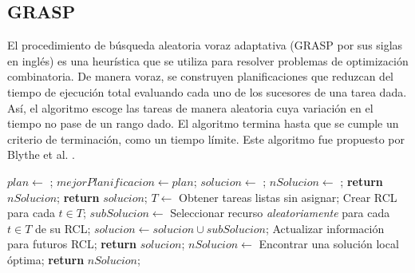 
\subsection{GRASP}
\label{alg:grasp}
El procedimiento de búsqueda aleatoria voraz adaptativa (GRASP por sus siglas en inglés) es una heurística que se utiliza para resolver problemas de optimización combinatoria. De manera voraz, se construyen planificaciones que reduzcan del tiempo de ejecución total evaluando cada uno de los sucesores de una tarea dada. Así, el algoritmo escoge las tareas de manera aleatoria cuya variación en el tiempo no pase de un rango dado. El algoritmo termina hasta que se cumple un criterio de terminación, como un tiempo límite. Este algoritmo fue propuesto por Blythe et al. \cite{blythe2005task}.
\\
\begin{algorithmic}[1]
	\State $plan \gets$ ;
		\State $mejorPlanificacion \gets plan$;
	\EndIf
\EndWhile
{}
	\State $solucion \gets$ ;
	\State $nSolucion \gets$ ;
		\State \textbf{return} $nSolucion$;
	\EndIf
	\State \textbf{return} $solucion$;
\EndProcedure
{}
		\State $T \gets$ Obtener tareas listas sin asignar;
		\State Crear RCL para cada $t \in T$;
		\State $subSolucion \gets$ Seleccionar recurso \emph{aleatoriamente} para cada $t \in T$ de su RCL;
		\State $solucion \gets solucion \cup subSolucion$;
		\State Actualizar información para futuros RCL;
	\EndWhile
	\State \textbf{return} $solucion$;
\EndProcedure
{}
	\State $nSolucion \gets$ Encontrar una solución local óptima;
	\State \textbf{return} $nSolucion$;
\EndProcedure
\end{algorithmic}

